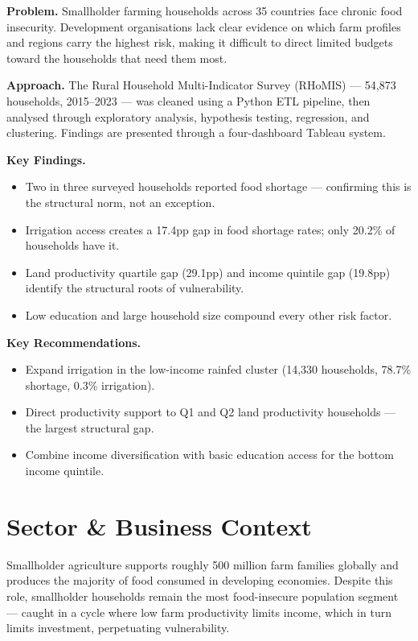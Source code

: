 \documentclass[11pt,a4paper]{article}
\begin{document}
\vspace{8pt}

\textbf{Problem.} Smallholder farming households across 35 countries face chronic food insecurity. Development organisations lack clear evidence on which farm profiles and regions carry the highest risk, making it difficult to direct limited budgets toward the households that need them most.

\textbf{Approach.} The Rural Household Multi-Indicator Survey (RHoMIS) — 54,873 households, 2015--2023 — was cleaned using a Python ETL pipeline, then analysed through exploratory analysis, hypothesis testing, regression, and clustering. Findings are presented through a four-dashboard Tableau system.

\textbf{Key Findings.}
\begin{itemize}
  \item Two in three surveyed households reported food shortage — confirming this is the structural norm, not an exception.
  \item Irrigation access creates a 17.4pp gap in food shortage rates; only 20.2\% of households have it.
  \item Land productivity quartile gap (29.1pp) and income quintile gap (19.8pp) identify the structural roots of vulnerability.
  \item Low education and large household size compound every other risk factor.
\end{itemize}

\textbf{Key Recommendations.}
\begin{itemize}
  \item Expand irrigation in the low-income rainfed cluster (14,330 households, 78.7\% shortage, 0.3\% irrigation).
  \item Direct productivity support to Q1 and Q2 land productivity households — the largest structural gap.
  \item Combine income diversification with basic education access for the bottom income quintile.
\end{itemize}

\newpage

\section{Sector \& Business Context}

Smallholder agriculture supports roughly 500 million farm families globally and produces the majority of food consumed in developing economies. Despite this role, smallholder households remain the most food-insecure population segment — caught in a cycle where low farm productivity limits income, which in turn limits investment, perpetuating vulnerability.
\end{document}
